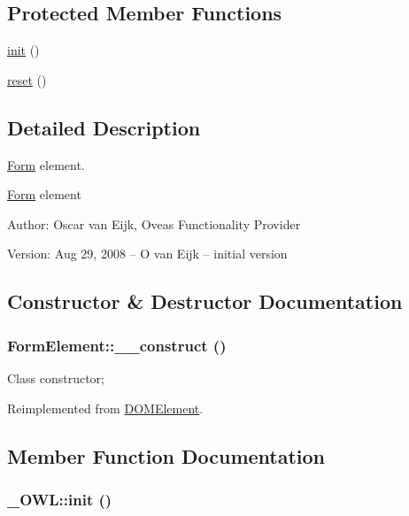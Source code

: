 \subsection*{Protected Member Functions}
\begin{CompactItemize}
\item 
\hyperlink{class__OWL_e0ef3ded56e8a6b34b6461e5a721cd3e}{init} ()
\item 
\hyperlink{class__OWL_2f2a042bcf31965194c03033df0edc9b}{reset} ()
\end{CompactItemize}


\subsection{Detailed Description}
\hyperlink{classForm}{Form} element. 

\hyperlink{classForm}{Form} element \begin{Desc}
\item[Author:]Oscar van Eijk, Oveas Functionality Provider \end{Desc}
\begin{Desc}
\item[Version:]Aug 29, 2008 -- O van Eijk -- initial version \end{Desc}


\subsection{Constructor \& Destructor Documentation}
\hypertarget{classFormElement_f5ecddb99f71fcd2a7b52b2dbcd4c4c5}{
\subsubsection{\setlength{\rightskip}{0pt plus 5cm}FormElement::\_\-\_\-construct ()}}
\label{classFormElement_f5ecddb99f71fcd2a7b52b2dbcd4c4c5}


Class constructor; 

Reimplemented from \hyperlink{classDOMElement_309ad8e22a59ba874187929c4c851be3}{DOMElement}.

\subsection{Member Function Documentation}
\hypertarget{class__OWL_e0ef3ded56e8a6b34b6461e5a721cd3e}{
\subsubsection{\setlength{\rightskip}{0pt plus 5cm}\_\-OWL::init ()}}
\label{class__OWL_e0ef3ded56e8a6b34b6461e5a721cd3e}


